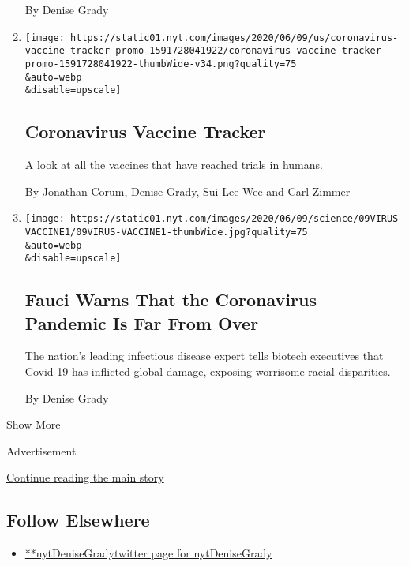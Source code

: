 \begin{enumerate}
  By Denise Grady
\item
  \href{/interactive/2020/science/coronavirus-vaccine-tracker.html}{}

  \texttt{[image: https://static01.nyt.com/images/2020/06/09/us/coronavirus-vaccine-tracker-promo-1591728041922/coronavirus-vaccine-tracker-promo-1591728041922-thumbWide-v34.png?quality=75\\\&auto=webp\\\&disable=upscale]}

  \hypertarget{coronavirus-vaccine-tracker}{%
  \subsection{Coronavirus Vaccine
  Tracker}\label{coronavirus-vaccine-tracker}}

  A look at all the vaccines that have reached trials in humans.

  By Jonathan Corum, Denise Grady, Sui-Lee Wee and Carl Zimmer
\item
  \href{/2020/06/09/health/fauci-vaccines-coronavirus.html}{}

  \texttt{[image: https://static01.nyt.com/images/2020/06/09/science/09VIRUS-VACCINE1/09VIRUS-VACCINE1-thumbWide.jpg?quality=75\\\&auto=webp\\\&disable=upscale]}

  \hypertarget{fauci-warns-that-the-coronavirus-pandemic-is-far-from-over}{%
  \subsection{Fauci Warns That the Coronavirus Pandemic Is Far From
  Over}\label{fauci-warns-that-the-coronavirus-pandemic-is-far-from-over}}

  The nation's leading infectious disease expert tells biotech
  executives that Covid-19 has inflicted global damage, exposing
  worrisome racial disparities.

  By Denise Grady
\end{enumerate}

Show More

Advertisement

\protect\hyperlink{after-mid2}{Continue reading the main story}

\hypertarget{follow-elsewhere}{%
\subsection{Follow Elsewhere}\label{follow-elsewhere}}

\begin{itemize}
\tightlist
\item
  \href{https://twitter.com/nytDeniseGrady}{**nytDeniseGradytwitter page
  for nytDeniseGrady}
\end{itemize}

